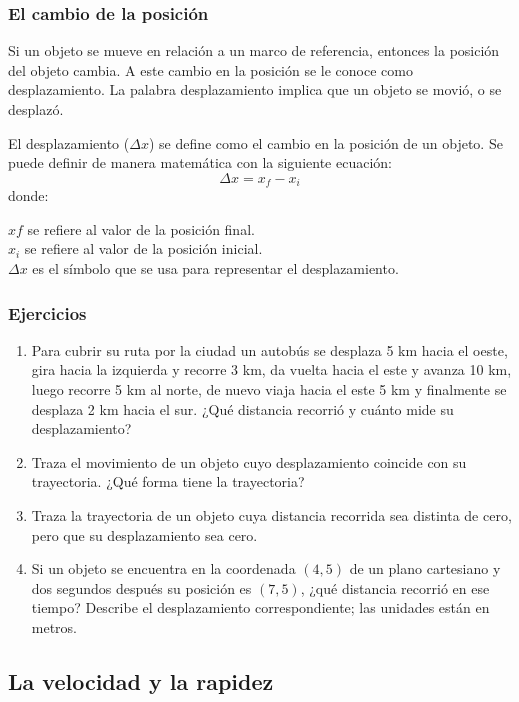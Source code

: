 \documentclass[11pt]{book}
\begin{document}
\subsubsection{El cambio de la posición}
Si un objeto se mueve en relación a un marco de referencia, entonces la posición del objeto
cambia. A este cambio en la posición se le conoce como desplazamiento. La palabra desplazamiento
implica que un objeto se movió, o se desplazó.

El desplazamiento ($\Delta x$) se define como el cambio en la posición de un objeto.
Se puede definir de
manera matemática con la siguiente ecuación:
\[\Delta x = x_f - x_i\]
donde:

$xf$ se refiere al valor de la posición final.\\
$x_i$ se refiere al valor de la posición inicial.\\
$\Delta x$ es el símbolo que se usa para representar el desplazamiento.\\

\subsubsection{Ejercicios}
\begin{enumerate}
    \item Para cubrir su ruta por la ciudad un autobús se desplaza 5 km hacia el oeste, gira hacia la izquierda y recorre 3 km, da vuelta hacia el este y avanza 10 km, luego recorre 5 km al norte, de nuevo viaja hacia el este 5 km y finalmente se desplaza 2 km hacia el sur. ¿Qué distancia recorrió y cuánto mide su desplazamiento?
    \item Traza el movimiento de un objeto cuyo desplazamiento coincide con su trayectoria. ¿Qué forma tiene la trayectoria?
    \item Traza la trayectoria de un objeto cuya distancia recorrida sea distinta de cero,
          pero que su desplazamiento sea cero.
    \item Si un objeto se encuentra en la coordenada $(4, 5)$ de un plano cartesiano y dos
          segundos después su posición es $(7, 5)$, ¿qué distancia recorrió en ese tiempo?
          Describe el desplazamiento correspondiente; las unidades están en metros.
\end{enumerate}

\newpage
\subsection{La velocidad y la rapidez}
\end{document}
